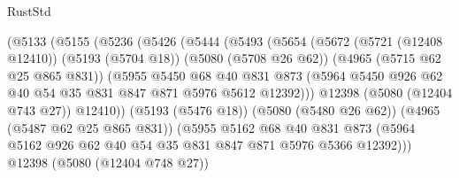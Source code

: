 \begin{lexlean}{RustStd}
\begin{coremodule}
{\begin{coremodule}
{{{{{                      (@5133
                        (@5155
                          (@5236
                            (@5426
                              (@5444
                                (@5493
                                  (@5654
                                    (@5672
                                      (@5721 (@12408 @12410))
                                      (@5193 (@5704 @18))
                                      (@5080 (@5708 @26 @62))
                                      (@4965 (@5715 @62 @25 @865 @831))
                                      (@5955
                                        @5450
                                        @68
                                        @40
                                        @831
                                        @873
                                        (@5964
                                          @5450
                                          @926
                                          @62
                                          @40
                                          @54
                                          @35
                                          @831
                                          @847
                                          @871
                                          @5976
                                          @5612
                                          @12392)))
                                    @12398
                                    (@5080 (@12404 @743 @27))
                                    @12410))
                                (@5193 (@5476 @18))
                                (@5080 (@5480 @26 @62))
                                (@4965 (@5487 @62 @25 @865 @831))
                                (@5955
                                  @5162
                                  @68
                                  @40
                                  @831
                                  @873
                                  (@5964
                                    @5162
                                    @926
                                    @62
                                    @40
                                    @54
                                    @35
                                    @831
                                    @847
                                    @871
                                    @5976
                                    @5366
                                    @12392)))
                              @12398
                              (@5080 (@12404 @748 @27))
}}}}}
\end{coremodule}}
\end{coremodule}
\end{lexlean}

